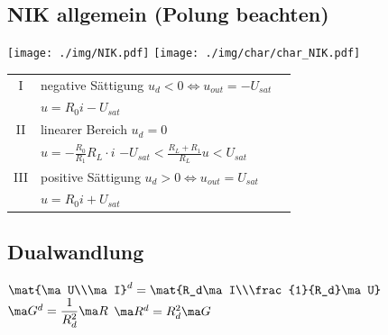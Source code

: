 \documentclass[fs, footer]{latex4ei}
\begin{document}
\begin{multicols*}{4}
{        \subsection{NIK allgemein (Polung beachten)}
        \texttt{[image: ./img/NIK.pdf]} \qquad \texttt{[image: ./img/char/char\_NIK.pdf]}\\
        \begin{tabular}{cll}
            I   & negative Sättigung $u_d < 0 \Leftrightarrow u_{out}=-U_{sat}$                                  \\
                & $u = R_0 i - U_{sat}$                                                                          \\ %
            II  & linearer Bereich $u_d = 0$                                                                     \\
                & $u = - \frac{R_0}{R_1} R_L \cdot i$ \qquad \quad $-U_{sat} < \frac{R_L + R_1}{R_L}u < U_{sat}$ \\
            III & positive Sättigung $u_d > 0 \Leftrightarrow u_{out}=U_{sat}$                                   \\
                & $u = R_0 i + U_{sat}$                                                                          %
        \end{tabular}
    }

    \subsection{Dualwandlung}
    $\mat{\ma U\\\ma I}^d = \mat{R_d\ma I\\\frac{1}{R_d}\ma U}$\\
    $\ma G^d = \frac{1}{R_d^2} \ma R$ \quad $\ma R^d = R_d^2 \ma G$


\end{multicols*}
\end{document}
